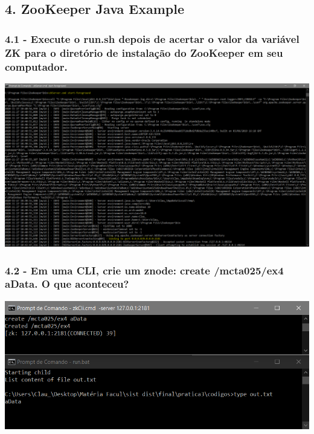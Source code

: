 \subsection*{4. ZooKeeper Java Example}


\subsubsection{4.1 - Execute o run.sh depois de acertar o valor da variável ZK para o diretório de instalação do ZooKeeper em seu computador.}
\includegraphics[width=20cm]{pratica3/prints/server_started.PNG}

\subsubsection{4.2 - Em uma CLI, crie um znode: create /mcta025/ex4 aData. O que
aconteceu?}

\includegraphics{pratica3/prints/roteiro 4.2.PNG}

